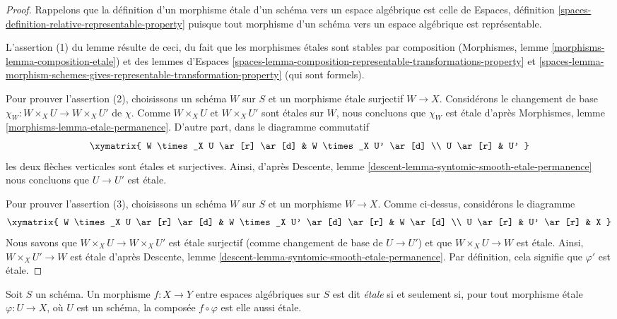 \begin{proof}
Rappelons que la définition d'un morphisme \'etale d'un schéma vers un
espace algébrique est celle de
Espaces, définition
\ref{spaces-definition-relative-representable-property}
puisque tout morphisme d'un schéma vers un espace algébrique
est représentable.

\medskip\noindent
L'assertion (1) du lemme résulte de ceci, du fait que
les morphismes \'etales sont stables par composition
(Morphismes, lemme
\ref{morphisms-lemma-composition-etale})
et des lemmes
d'Espaces
\ref{spaces-lemma-composition-representable-transformations-property} et
\ref{spaces-lemma-morphism-schemes-gives-representable-transformation-property}
(qui sont formels).

\medskip\noindent
Pour prouver l'assertion (2), choisissons un schéma $W$ sur $S$ et un
morphisme \'etale surjectif $W \to X$. Considérons le changement de base
$\chi_W : W \times_X U \to W \times_X U'$ de $\chi$.
Comme $W \times_X U$ et $W \times_X U'$ sont \'etales sur $W$, nous concluons que
$\chi_W$ est \'etale d'après
Morphismes, lemme \ref{morphisms-lemma-etale-permanence}.
D'autre part, dans le diagramme commutatif
$$
\xymatrix{
W \times_X U \ar[r] \ar[d] & W \times_X U' \ar[d] \\
U \ar[r] & U'
}
$$
les deux flèches verticales sont \'etales et surjectives.
Ainsi, d'après
Descente, lemme \ref{descent-lemma-syntomic-smooth-etale-permanence}
nous concluons que $U \to U'$ est \'etale.

\medskip\noindent
Pour prouver l'assertion (3), choisissons un schéma $W$ sur $S$ et un morphisme $W \to X$.
Comme ci-dessus, considérons le diagramme
$$
\xymatrix{
W \times_X U \ar[r] \ar[d] & W \times_X U' \ar[d] \ar[r] & W \ar[d] \\
U \ar[r] & U' \ar[r] & X
}
$$
Nous savons que $W \times_X U \to W \times_X U'$ est \'etale surjectif
(comme changement de base de $U \to U'$)
et que $W \times_X U \to W$ est \'etale. Ainsi, $W \times_X U' \to W$
est \'etale d'après Descente, lemme
\ref{descent-lemma-syntomic-smooth-etale-permanence}. Par définition,
cela signifie que $\varphi'$ est \'etale.
\end{proof}

\begin{definition}
\label{definition-etale}
Soit $S$ un schéma.
Un morphisme $f : X \to Y$ entre espaces algébriques sur $S$ est
dit {\it \'etale} si et seulement si, pour tout morphisme \'etale
$\varphi : U \to X$, où $U$ est un schéma, la composée
$f \circ \varphi$ est elle aussi \'etale.
\end{definition}

